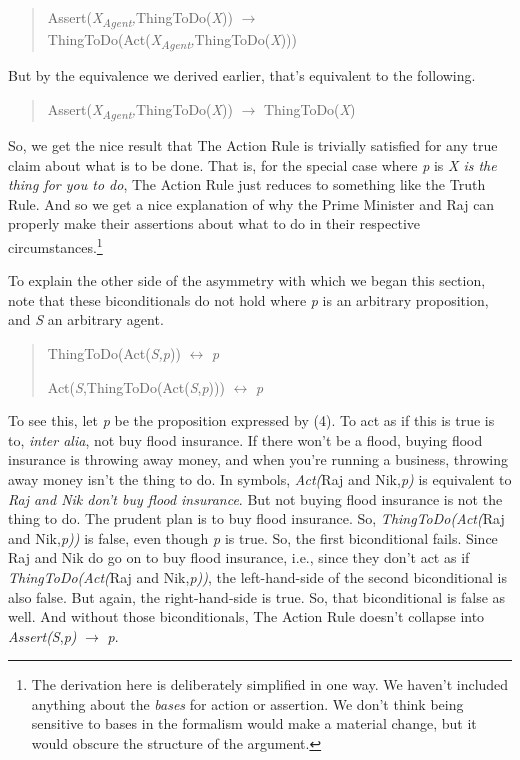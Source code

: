 \documentclass[
  11pt,
  letterpaper,
  DIV=11,
  numbers=noendperiod]{scrartcl}
\begin{document}
\begin{quote}
Assert(\emph{X\textsubscript{Agent},}ThingToDo(\emph{X}))
\({\rightarrow}\)
ThingToDo(Act(\emph{X\textsubscript{Agent},}ThingToDo(\emph{X})))
\end{quote}

But by the equivalence we derived earlier, that's equivalent to the
following.

\begin{quote}
Assert(\emph{X\textsubscript{Agent},}ThingToDo(\emph{X}))
\({\rightarrow}\) ThingToDo(\emph{X})
\end{quote}

So, we get the nice result that The Action Rule is trivially satisfied
for any true claim about what is to be done. That is, for the special
case where \emph{p} is \emph{X is the thing for you to do}, The Action
Rule just reduces to something like the Truth Rule. And so we get a nice
explanation of why the Prime Minister and Raj can properly make their
assertions about what to do in their respective
circumstances.\footnote{The derivation here is deliberately simplified
  in one way. We haven't included anything about the \emph{bases} for
  action or assertion. We don't think being sensitive to bases in the
  formalism would make a material change, but it would obscure the
  structure of the argument.}

To explain the other side of the asymmetry with which we began this
section, note that these biconditionals do not hold where \emph{p} is an
arbitrary proposition, and \emph{S} an arbitrary agent.

\begin{quote}
ThingToDo(Act(\emph{S,p})) \({\leftrightarrow}\) \emph{p}

Act(\emph{S},ThingToDo(Act(\emph{S},\emph{p}))) \({\leftrightarrow}\)
\emph{p}
\end{quote}

To see this, let \emph{p} be the proposition expressed by (4). To act as
if this is true is to, \emph{inter alia}, not buy flood insurance. If
there won't be a flood, buying flood insurance is throwing away money,
and when you're running a business, throwing away money isn't the thing
to do. In symbols, \emph{Act(}Raj and Nik,\emph{p)} is equivalent to
\emph{Raj and Nik don't buy flood insurance}. But not buying flood
insurance is not the thing to do. The prudent plan is to buy flood
insurance. So, \emph{ThingToDo(Act(}Raj and Nik,\emph{p))} is false,
even though \emph{p} is true. So, the first biconditional fails. Since
Raj and Nik do go on to buy flood insurance, i.e., since they don't act
as if \emph{ThingToDo(Act(}Raj and Nik,\emph{p))}, the left-hand-side of
the second biconditional is also false. But again, the right-hand-side
is true. So, that biconditional is false as well. And without those
biconditionals, The Action Rule doesn't collapse into
\emph{Assert(S},\emph{p)} \({\rightarrow}\) \emph{p}.
\end{document}
